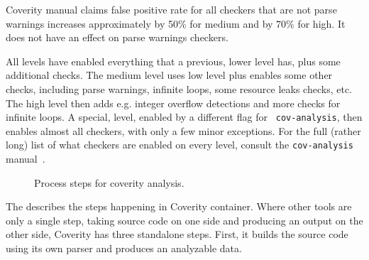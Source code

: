 Coverity manual claims false positive rate for all checkers that are not parse
warnings increases approximately by 50\% for medium and by 70\% for high. It
does not have an effect on parse warnings checkers.

All levels have enabled everything that a previous, lower level has, plus some
additional checks. The medium level uses low level plus enables some other
checks, including parse warnings, infinite loops, some resource leaks checks,
etc. The high level then adds e.g. integer overflow detections and more checks
for infinite loops. A special, level, enabled by a different flag for {\tt
cov-analysis}, then enables almost all checkers, with only a few minor
exceptions. For the full (rather long) list of what checkers are enabled on every
level, consult the {\tt cov-analysis} manual~\cite{coverityMan}.

\begin{figure}
\caption{Process steps for coverity analysis.}
\label{fig:techniques:coverity:steps}
\end{figure}

The  describes the steps happening in
Coverity container. Where other tools are only a single step, taking source
code on one side and producing an output on the other side, Coverity has three
standalone steps. First, it builds the source code using its own parser and
produces an analyzable data. 

